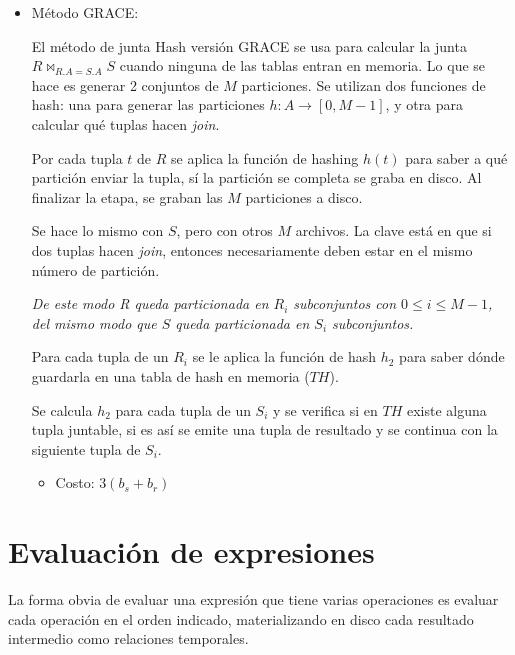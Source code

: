 \documentclass[a4paper, twoside]{article}
\newcommand{\codedir}{../resources/code} %
\begin{document}
\begin{itemize}
	

	\item Método GRACE:

	El método de junta Hash versión GRACE se usa para calcular la junta $R \bowtie_{R.A=S.A}S$ cuando ninguna de las tablas entran en memoria. Lo que se hace es generar 2 conjuntos de $M$ particiones. Se utilizan dos funciones de hash: una para generar las particiones $h:A\to[0,M-1]$, y otra para calcular qué tuplas hacen \emph{join}.

		\subsubitem{-} Por cada tupla $t$ de $R$ se aplica la función de hashing $h(t)$ para saber a qué partición enviar la tupla, sí la partición se completa se graba en disco. Al finalizar la etapa, se graban las $M$ particiones a disco.

		\subsubitem{-} Se hace lo mismo con $S$, pero con otros $M$ archivos. La clave está en que si dos tuplas hacen \emph{join}, entonces necesariamente deben estar en el mismo número de partición. 
		
\textit{De este modo R queda particionada en $R_{i}$ subconjuntos con $0 \leq i \leq M-1$, del mismo modo que $S$ queda particionada en $S_{i}$ subconjuntos.}

		\subsubitem{-} Para cada tupla de un $R_{i}$ se le aplica la función de hash $h_{2}$ para saber dónde guardarla en una tabla de hash en memoria ($TH$). 
		
		\subsubitem{-} Se calcula $h_{2}$ para cada tupla de un $S_{i}$ y se verifica si en $TH$ existe alguna tupla juntable, si es así se emite una tupla de resultado y se continua con la siguiente tupla de $S_{i}$.
	\begin{itemize}
		\item Costo: $3\left(b_{s}+b_{r}\right)$
	\end{itemize}

	
\end{itemize}

\section{Evaluación de expresiones}
La forma obvia de evaluar una expresión que tiene varias operaciones es evaluar cada operación en el orden indicado, materializando en disco cada resultado intermedio como relaciones temporales.
\end{document}
